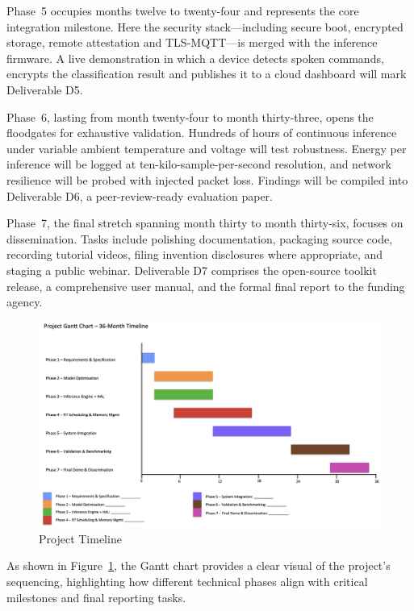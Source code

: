 Phase~5 occupies months twelve to twenty-four and represents the core integration milestone. Here the security stack—including secure boot, encrypted storage, remote attestation and TLS-MQTT—is merged with the inference firmware. A live demonstration in which a device detects spoken commands, encrypts the classification result and publishes it to a cloud dashboard will mark Deliverable D5.

Phase~6, lasting from month twenty-four to month thirty-three, opens the floodgates for exhaustive validation. Hundreds of hours of continuous inference under variable ambient temperature and voltage will test robustness. Energy per inference will be logged at ten-kilo-sample-per-second resolution, and network resilience will be probed with injected packet loss. Findings will be compiled into Deliverable D6, a peer-review-ready evaluation paper.

Phase~7, the final stretch spanning month thirty to month thirty-six, focuses on dissemination. Tasks include polishing documentation, packaging source code, recording tutorial videos, filing invention disclosures where appropriate, and staging a public webinar. Deliverable D7 comprises the open-source toolkit release, a comprehensive user manual, and the formal final report to the funding agency.

\begin{figure}[htbp]
  \centering
  \includegraphics[width=\textwidth]{gantt.png}
  \caption{Project Timeline}
  \label{fig:project_gantt}
\end{figure}

As shown in Figure~\ref{fig:project_gantt}, the Gantt chart provides a clear visual of the project's sequencing, highlighting how different technical phases align with critical milestones and final reporting tasks.



